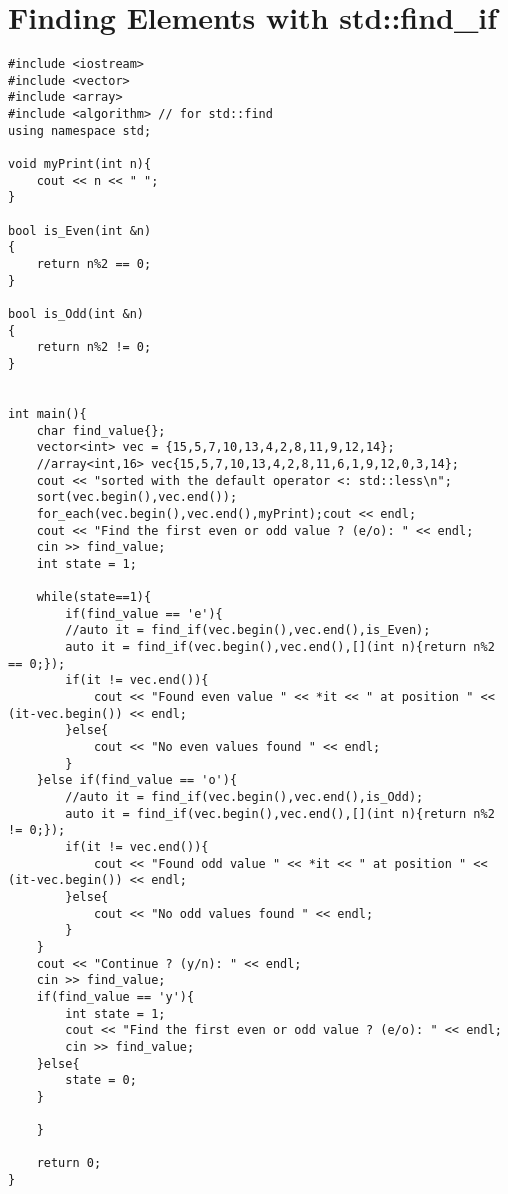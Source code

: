 \documentclass[12pt]{article}
\begin{document}
\section*{Finding Elements with std::find_if}
\begin{verbatim}
#include <iostream>
#include <vector>
#include <array>
#include <algorithm> // for std::find
using namespace std;

void myPrint(int n){
    cout << n << " ";
}

bool is_Even(int &n)
{
    return n%2 == 0;
}

bool is_Odd(int &n)
{
    return n%2 != 0;
}


int main(){
    char find_value{};
    vector<int> vec = {15,5,7,10,13,4,2,8,11,9,12,14};
    //array<int,16> vec{15,5,7,10,13,4,2,8,11,6,1,9,12,0,3,14};
    cout << "sorted with the default operator <: std::less\n";
    sort(vec.begin(),vec.end());
    for_each(vec.begin(),vec.end(),myPrint);cout << endl;
    cout << "Find the first even or odd value ? (e/o): " << endl;
    cin >> find_value;
    int state = 1;

    while(state==1){
        if(find_value == 'e'){
        //auto it = find_if(vec.begin(),vec.end(),is_Even);
        auto it = find_if(vec.begin(),vec.end(),[](int n){return n%2 == 0;});
        if(it != vec.end()){
            cout << "Found even value " << *it << " at position " << (it-vec.begin()) << endl;
        }else{
            cout << "No even values found " << endl;
        }
    }else if(find_value == 'o'){
        //auto it = find_if(vec.begin(),vec.end(),is_Odd);
        auto it = find_if(vec.begin(),vec.end(),[](int n){return n%2 != 0;});
        if(it != vec.end()){
            cout << "Found odd value " << *it << " at position " << (it-vec.begin()) << endl;
        }else{
            cout << "No odd values found " << endl;
        }
    }
    cout << "Continue ? (y/n): " << endl;
    cin >> find_value;
    if(find_value == 'y'){
        int state = 1;
        cout << "Find the first even or odd value ? (e/o): " << endl;
        cin >> find_value;
    }else{
        state = 0;
    }
    
    }
    
    return 0;
}
\end{verbatim}
\end{document}
